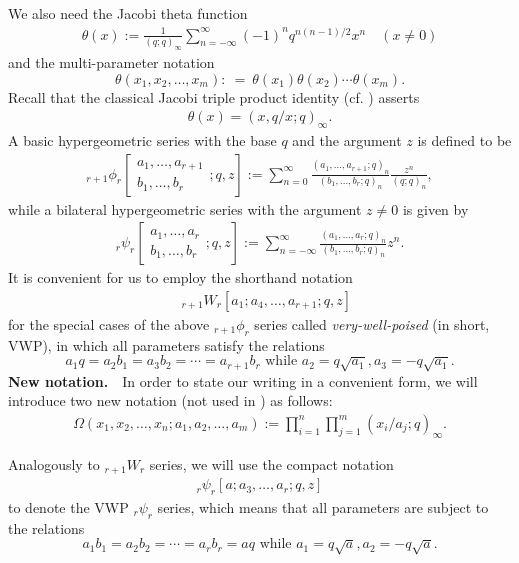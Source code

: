 \documentclass[xits,review,sort&compress]{elsarticle}
\numberwithin{equation}{section}
\newcommand{\poq}[2]{(#1;q)_{#2}}
\begin{document}
We also need  the  Jacobi theta function
\begin{align}
\theta(x):=\frac{1}{\poq{q}{\infty}}\sum_{n=-\infty}^\infty (-1)^nq^{n(n-1)/2}x^n\quad(x\neq 0)\label{jacobintheta-def}
\end{align}
and the multi-parameter notation
\[\theta(x_1,x_2,\ldots,x_m):\:=\:\theta(x_1)\theta(x_2)\cdots\theta(x_m).\]
Recall that  the classical Jacobi triple product identity (cf. \cite[(II.28)]{10}) asserts
\begin{align}
\theta(x)=(x,q/x;q)_\infty.\label{jacobintheta}
\end{align}
A basic  hypergeometric series with the
base $q$ and the argument $z$   is defined  to be
\begin{align}
{}_{r+1}\phi _{r}\left[\begin{matrix}a_{1},\dots ,a_{r+1}\\ b_{1},\dots ,b_{r}\end{matrix}
; q, z\right]:=\sum _{n=0} ^{\infty }\frac{\poq {a_{1},\ldots
,a_{r+1}}{n}}{\poq
{b_{1},\ldots,b_{r}}{n}}\frac{z^{n}}{\poq{q}{n}},\label{fpfbasic}
\end{align}
while a  bilateral hypergeometric series with the argument $z\neq 0$  is given  by
\begin{eqnarray}
{}_{r}\psi _{r}\left[\begin{matrix}a_{1},\dots ,a_{r}\\
b_{1},\dots ,b_{r}\end{matrix} ; q, z\right]:=\sum _{n=-\infty}
^{\infty }\frac{\poq {a_{1},\ldots,a_{r}}{n}}{\poq{b_{1},\ldots,b_{r}}{n}}z^{n}.\label{fpfbibasic}
\end{eqnarray}
It is convenient for us to employ the shorthand notation
\begin{align}
&\,_{r+1}W_{r}[a_1;a_4,\ldots,a_{r+1};q,z]
\end{align} for the special cases
 of the above ${}_{r+1}\phi _{r}$ series called  \emph{very-well-poised} (in short, VWP), in which all parameters
satisfy the relations
$$
a_1q=a_2b_1=a_3b_2=\cdots=a_{r+1}b_{r}\,\,\mbox{while}\,\, a_2=q\sqrt{a_1},a_3=-q\sqrt{a_1}.
$$
{\bf New notation.}~~In order to state our writing in a convenient form,  we will introduce  two new notation (not used in \cite{10}) as follows:
\begin{align}
\Omega(x_1,x_2,\ldots,x_n;a_1,a_2,\ldots,a_m):=\prod_{i=1}^n\prod_{j=1}^m\poq{x_i/a_j}{\infty}.
\end{align}

Analogously to ${}_{r+1}W_r$ series, we will use the compact notation
\begin{align}{}_{r}\psi _{r}\left[a;a_3,\ldots,a_{r};q,z\right]
\end{align} to denote the  VWP  ${}_{r}\psi_{r}$ series, which means that all parameters are
subject to the relations
$$
a_1b_1=a_2b_2=\cdots=a_{r}b_{r}=aq\,\,\mbox{while}\,\, a_1=q\sqrt{a},a_2=-q\sqrt{a}.
$$
\end{document}
